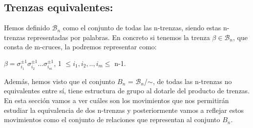 \bigskip
	\subsection{Trenzas equivalentes:}\label{trenzasequi}
	
	Hemos definido $\mathscr{B}_{n}$ como el conjunto de todas las n-trenzas, siendo estas n-trenzas representadas por palabras. En concreto si tenemos la trenza $\beta \in \mathscr{B}_{n}$, que consta de m-cruces, la podremos representar como:
    \begin{center}
    	$\beta = \sigma_{i_{1}}^{\pm 1} \sigma_{i_{2}}^{\pm 1} ... \sigma_{i_{m}}^{\pm 1} $, 1 $\le i_{1}, i_{2},..,i_{m} \le$ n-1.
    \end{center}
	
	Además, hemos visto que el conjunto $B_{n} $ = $\mathscr{B}_{n}$/$ \sim $, de todas las n-trenzas no equivalentes entre sí, tiene estructura de grupo al dotarle del producto de trenzas.\\
	
	En esta sección vamos a ver cuáles son los movimientos que nos permitirán estudiar la equivalencia de dos n-trenzas y posteriormente vamos a reflejar estos movimientos como el conjunto de relaciones que representan al conjunto $B_{n}$.\\
	
